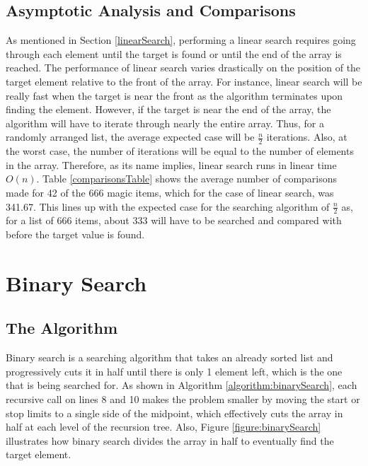\documentclass[letterpaper, 10pt,DIV=13]{scrartcl}
\numberwithin{equation}{section} %
\numberwithin{figure}{section} %
\numberwithin{table}{section} %
\begin{document}
\subsection{Asymptotic Analysis and Comparisons}
As mentioned in Section \ref{linearSearch}, performing a linear search requires going through each element until the target is found or until the end of the array is reached. The performance of linear search varies drastically on the position of the target element relative to the front of the array. For instance, linear search will be really fast when the target is near the front as the algorithm terminates upon finding the element. However, if the target is near the end of the array, the algorithm will have to iterate through nearly the entire array. Thus, for a randomly arranged list, the average expected case will be $\frac{n}{2}$ iterations. Also, at the worst case, the number of iterations will be equal to the number of elements in the array. Therefore, as its name implies, linear search runs in linear time $O(n)$. Table \ref{comparisonsTable} shows the average number of comparisons made for 42 of the 666 magic items, which for the case of linear search, was 341.67. This lines up with the expected case for the searching algorithm of $\frac{n}{2}$ as, for a list of 666 items, about 333 will have to be searched and compared with before the target value is found.

\section{Binary Search}
\subsection{The Algorithm}\label{binarySearch}
Binary search is a searching algorithm that takes an already sorted list and progressively cuts it in half until there is only 1 element left, which is the one that is being searched for. As shown in Algorithm \ref{algorithm:binarySearch}, each recursive call on lines 8 and 10 makes the problem smaller by moving the start or stop limits to a single side of the midpoint, which effectively cuts the array in half at each level of the recursion tree. Also, Figure \ref{figure:binarySearch} illustrates how binary search divides the array in half to eventually find the target element.
\end{document}
